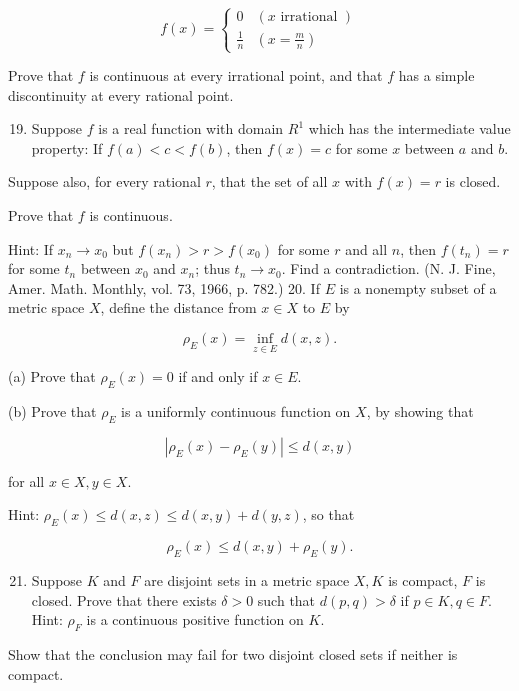 \documentclass[10pt]{article}
\begin{document}
$$
f(x)= \begin{cases}0 & (x \text { irrational }) \\ \frac{1}{n} & \left(x=\frac{m}{n}\right)\end{cases}
$$

Prove that $f$ is continuous at every irrational point, and that $f$ has a simple discontinuity at every rational point.

\begin{enumerate}
  \setcounter{enumi}{18}
  \item Suppose $f$ is a real function with domain $R^{1}$ which has the intermediate value property: If $f(a)<c<f(b)$, then $f(x)=c$ for some $x$ between $a$ and $b$.
\end{enumerate}

Suppose also, for every rational $r$, that the set of all $x$ with $f(x)=r$ is closed.

Prove that $f$ is continuous.

Hint: If $x_{n} \rightarrow x_{0}$ but $f\left(x_{n}\right)>r>f\left(x_{0}\right)$ for some $r$ and all $n$, then $f\left(t_{n}\right)=r$ for some $t_{n}$ between $x_{0}$ and $x_{n}$; thus $t_{n} \rightarrow x_{0}$. Find a contradiction. (N. J. Fine, Amer. Math. Monthly, vol. 73, 1966, p. 782.) 20. If $E$ is a nonempty subset of a metric space $X$, define the distance from $x \in X$ to $E$ by

$$
\rho_{E}(x)=\inf _{z \in E} d(x, z) .
$$

(a) Prove that $\rho_{E}(x)=0$ if and only if $x \in E$.

(b) Prove that $\rho_{E}$ is a uniformly continuous function on $X$, by showing that

$$
\left|\rho_{E}(x)-\rho_{E}(y)\right| \leq d(x, y)
$$

for all $x \in X, y \in X$.

Hint: $\rho_{E}(x) \leq d(x, z) \leq d(x, y)+d(y, z)$, so that

$$
\rho_{E}(x) \leq d(x, y)+\rho_{E}(y) .
$$

\begin{enumerate}
  \setcounter{enumi}{20}
  \item Suppose $K$ and $F$ are disjoint sets in a metric space $X, K$ is compact, $F$ is closed. Prove that there exists $\delta>0$ such that $d(p, q)>\delta$ if $p \in K, q \in F$. Hint: $\rho_{F}$ is a continuous positive function on $K$.
\end{enumerate}

Show that the conclusion may fail for two disjoint closed sets if neither is compact.
\end{document}
